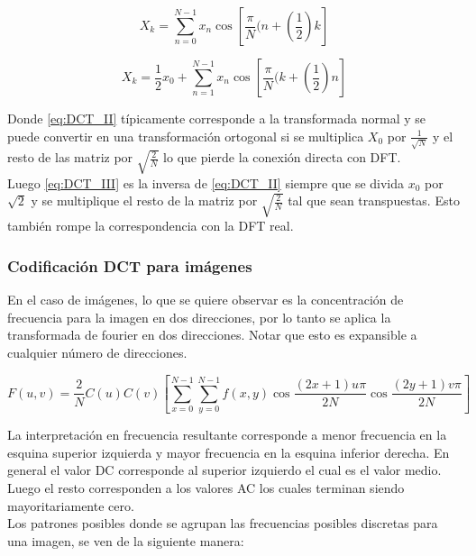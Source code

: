     \begin{equation} \label{eq:DCT_II}
        X_k = \sum_{n=0}^{N-1}x_n \cos{\left[\frac{\pi}{N}(n+\left(\frac{1}{2}\right)k\right]}
    \end{equation}

    \begin{equation} \label{eq:DCT_III}
        X_k = \frac{1}{2}x_0 + \sum_{n=1}^{N-1}x_n\cos{\left[\frac{\pi}{N}(k+\left(\frac{1}{2}\right)n\right]}
    \end{equation}
    
    Donde \ref{eq:DCT_II} típicamente corresponde a la transformada normal y se puede convertir en una transformación ortogonal si se multiplica $X_0$ por $\frac{1}{\sqrt{N}}$ y el resto de las matriz por $\sqrt{\frac{2}{N}}$ lo que pierde la conexión directa con DFT.\\

    Luego \ref{eq:DCT_III} es la inversa de \ref{eq:DCT_II} siempre que se divida $x_0$ por $\sqrt{2}$ y se multiplique el resto de la matriz por $\sqrt{\frac{2}{N}}$ tal que sean transpuestas. Esto también rompe la correspondencia con la DFT real.

    \subsubsection{Codificación DCT para imágenes}
        En el caso de imágenes, lo que se quiere observar es la concentración de frecuencia para la imagen en dos direcciones, por lo tanto se aplica la transformada de fourier en dos direcciones. Notar que esto es expansible a cualquier número de direcciones.

        \begin{equation*}
            F(u,v) = \frac{2}{N}C(u)C(v)\left[\sum_{x=0}^{N-1}\sum_{y=0}^{N-1}f(x,y) \cos{\frac{(2x+1)u\pi}{2N}} \cos{\frac{(2y+1)v\pi}{2N}} \right]
        \end{equation*}

        La interpretación en frecuencia resultante corresponde a menor frecuencia en la esquina superior izquierda y mayor frecuencia en la esquina inferior derecha. En general el valor DC corresponde al superior izquierdo el cual es el valor medio. Luego el resto corresponden a los valores AC los cuales terminan siendo mayoritariamente cero.\\

        Los patrones posibles donde se agrupan las frecuencias posibles discretas para una imagen, se ven de la siguiente manera:

